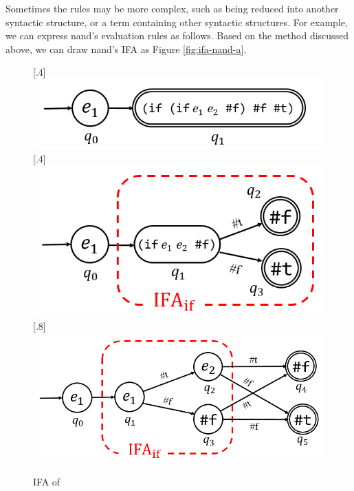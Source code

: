 Sometimes the rules may be more complex, such as being reduced into another syntactic structure, or a term containing other syntactic structures. For example, we can express nand's evaluation rules as follows. Based on the method discussed above, we can draw nand's IFA as Figure \ref{fig:ifa-nand-a}.



\begin{figure}[thbp]
\centering
{}[.4\linewidth]{
    \includegraphics[scale=0.25]{images/ifa-nand-1.png}
}
[.4\linewidth]{
    \includegraphics[scale=0.25]{images/ifa-nand-2.png}
}
[.8\linewidth]{
    \includegraphics[scale=0.25]{images/ifa-nand-3.png}
}
\caption{IFA of }
\label{fig:ifa-nand}
\end{figure}

